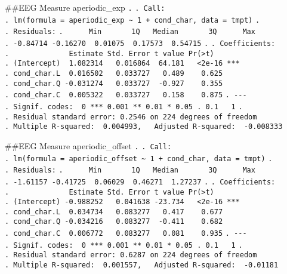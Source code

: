 \documentclass[
]{article}
\begin{document}
\#\#EEG Measure aperiodic\_exp \texttt{.} \texttt{.\ Call:}
\texttt{.\ lm(formula\ =\ aperiodic\_exp\ \textasciitilde{}\ 1\ +\ cond\_char,\ data\ =\ tmpt)}
\texttt{.} \texttt{.\ Residuals:}
\texttt{.\ \ \ \ \ \ Min\ \ \ \ \ \ \ 1Q\ \ \ Median\ \ \ \ \ \ \ 3Q\ \ \ \ \ \ Max}
\texttt{.\ -0.84714\ -0.16270\ \ 0.01075\ \ 0.17573\ \ 0.54715}
\texttt{.} \texttt{.\ Coefficients:}
\texttt{.\ \ \ \ \ \ \ \ \ \ \ \ \ \ Estimate\ Std.\ Error\ t\ value\ Pr(\textgreater{}\textbar{}t\textbar{})}
\texttt{.\ (Intercept)\ \ 1.082314\ \ \ 0.016864\ \ 64.181\ \ \ \textless{}2e-16\ ***}
\texttt{.\ cond\_char.L\ \ 0.016502\ \ \ 0.033727\ \ \ 0.489\ \ \ \ 0.625}
\texttt{.\ cond\_char.Q\ -0.031274\ \ \ 0.033727\ \ -0.927\ \ \ \ 0.355}
\texttt{.\ cond\_char.C\ \ 0.005322\ \ \ 0.033727\ \ \ 0.158\ \ \ \ 0.875}
\texttt{.\ -\/-\/-}
\texttt{.\ Signif.\ codes:\ \ 0\ \textquotesingle{}***\textquotesingle{}\ 0.001\ \textquotesingle{}**\textquotesingle{}\ 0.01\ \textquotesingle{}*\textquotesingle{}\ 0.05\ \textquotesingle{}.\textquotesingle{}\ 0.1\ \textquotesingle{}\ \textquotesingle{}\ 1}
\texttt{.}
\texttt{.\ Residual\ standard\ error:\ 0.2546\ on\ 224\ degrees\ of\ freedom}
\texttt{.\ Multiple\ R-squared:\ \ 0.004993,\ \ \ Adjusted\ R-squared:\ \ -0.008333}

\#\#EEG Measure aperiodic\_offset \texttt{.} \texttt{.\ Call:}
\texttt{.\ lm(formula\ =\ aperiodic\_offset\ \textasciitilde{}\ 1\ +\ cond\_char,\ data\ =\ tmpt)}
\texttt{.} \texttt{.\ Residuals:}
\texttt{.\ \ \ \ \ \ Min\ \ \ \ \ \ \ 1Q\ \ \ Median\ \ \ \ \ \ \ 3Q\ \ \ \ \ \ Max}
\texttt{.\ -1.61157\ -0.41725\ \ 0.06029\ \ 0.46271\ \ 1.27237}
\texttt{.} \texttt{.\ Coefficients:}
\texttt{.\ \ \ \ \ \ \ \ \ \ \ \ \ \ Estimate\ Std.\ Error\ t\ value\ Pr(\textgreater{}\textbar{}t\textbar{})}
\texttt{.\ (Intercept)\ -0.988252\ \ \ 0.041638\ -23.734\ \ \ \textless{}2e-16\ ***}
\texttt{.\ cond\_char.L\ \ 0.034734\ \ \ 0.083277\ \ \ 0.417\ \ \ \ 0.677}
\texttt{.\ cond\_char.Q\ -0.034216\ \ \ 0.083277\ \ -0.411\ \ \ \ 0.682}
\texttt{.\ cond\_char.C\ \ 0.006772\ \ \ 0.083277\ \ \ 0.081\ \ \ \ 0.935}
\texttt{.\ -\/-\/-}
\texttt{.\ Signif.\ codes:\ \ 0\ \textquotesingle{}***\textquotesingle{}\ 0.001\ \textquotesingle{}**\textquotesingle{}\ 0.01\ \textquotesingle{}*\textquotesingle{}\ 0.05\ \textquotesingle{}.\textquotesingle{}\ 0.1\ \textquotesingle{}\ \textquotesingle{}\ 1}
\texttt{.}
\texttt{.\ Residual\ standard\ error:\ 0.6287\ on\ 224\ degrees\ of\ freedom}
\texttt{.\ Multiple\ R-squared:\ \ 0.001557,\ \ \ Adjusted\ R-squared:\ \ -0.01181}
\end{document}
